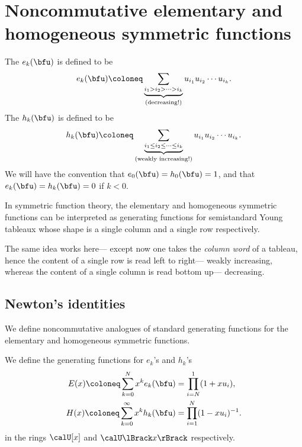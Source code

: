 \documentclass{article}
\begin{document}
\section{
    Noncommutative elementary and homogeneous symmetric functions
}

\begin{definition}
    The  $e_k(\bfu)$ is defined to be
    \begin{equation}
        \label{eqn:ncElementaryDef}
        e_k(\bfu)
        \coloneq
        \underbrace{
            \sum_{i_1 > i_2 > \cdots > i_k}
        }_{\text{(decreasing!)}}
        u_{i_1} u_{i_2} \cdots u_{i_k}. 
    \end{equation}
    The  $h_k(\bfu)$ is defined to be
    \begin{equation}
        \label{eqn:ncHomogeneousDef}
        h_k(\bfu)
        \coloneq
        \underbrace{
            \sum_{i_1 \leq i_2 \leq \cdots \leq i_k}
        }_{\text{(weakly increasing!)}}
        u_{i_1} u_{i_2} \cdots u_{i_k}. 
    \end{equation}
    We will have the convention that $e_0(\bfu) = h_0(\bfu) = 1$, and that $e_k(\bfu) = h_k(\bfu) = 0$ if $k < 0$.
\end{definition}

In symmetric function theory, the elementary and homogeneous symmetric functions can be interpreted as generating functions for semistandard Young tableaux whose shape is a single column and a single row respectively.

The same idea works here--- except now one takes the \textit{column word} of a tableau, hence the content of a single row is read left to right--- weakly increasing, whereas the content of a single column is read bottom up--- decreasing.

\subsection{
    Newton's identities
}

We define noncommutative analogues of standard generating functions for the elementary and homogeneous symmetric functions.

\begin{definition}
    \label{def:rowcolGenFuncs}
    We define the generating functions for $e_k$'s and $h_k$'s
    \begin{align}
        \label{eqn:colGenFunc}
        E(x)
        \coloneq
        \sum_{k=0}^N
        x^k e_k(\bfu)
        &=
        \prod_{i=N}^1
        (1+xu_i),
        \\
        \label{eqn:rowGenFunc}
        H(x)
        \coloneq
        \sum_{k=0}^\infty
        x^k h_k(\bfu)
        &=
        \prod_{i=1}^N
        (1-xu_i)^{-1}.
    \end{align}
    in the rings $\calU[x]$ and $\calU\lBrack x \rBrack$ respectively.
\end{definition}
\end{document}

